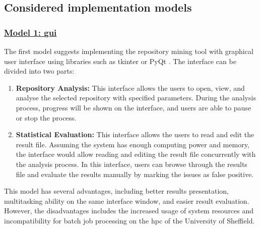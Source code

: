 \documentclass[12pt, a4paper]{report}
\begin{document}
\subsection{Considered implementation models}

\subsubsection*{\underline{Model 1: \acrfull{gui}}} \label{subsec:model1}
The first model suggests implementing the repository mining tool with graphical user interface using
libraries such as tkinter \cite{tkinter} or PyQt \cite{pyqt}. The interface can be divided into two
parts:
\begin{enumerate}
  \item \textbf{Repository Analysis:} This interface allows the users to open, view, and analyse the
  selected repository with specified parameters. During the analysis process, progress will be shown
  on the interface, and users are able to pause or stop the process.
  \item \textbf{Statistical Evaluation:} This interface allows the users to read and edit the result
  file. Assuming the system has enough computing power and memory, the interface would allow reading
  and editing the result file concurrently with the analysis process. In this interface, users can
  browse through the results file and evaluate the results manually by marking the issues as false
  positive.
\end{enumerate}

This model has several advantages, including better results presentation, multitasking ability on
the same interface window, and easier result evaluation. However, the disadvantages includes the
increased usage of system resources and incompatibility for batch job processing on the
\acrfull{hpc} of the University of Sheffield.
\end{document}
